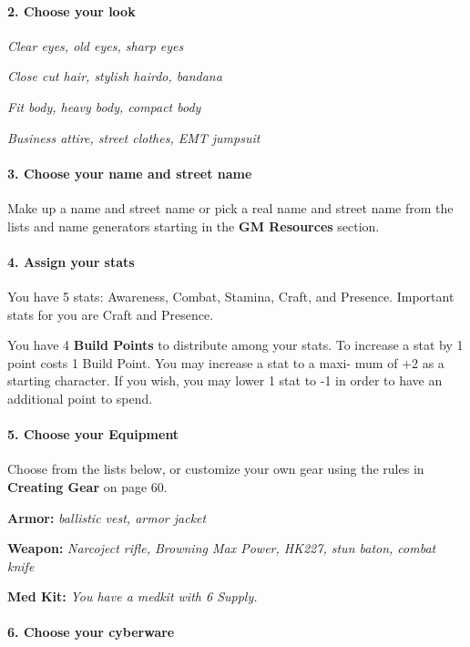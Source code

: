 \begin{multicols}{3}
\paragraph{2.  Choose your look}

\textit{Clear eyes, old eyes, sharp eyes}

\textit{Close cut hair, stylish hairdo, bandana}

\textit{Fit body, heavy body, compact body}

\textit{Business attire, street clothes, EMT jumpsuit}

\paragraph{3.  Choose your name and street name}

Make up a name and street name or pick a real
name and street name from the lists and name
generators starting in the \textbf{GM Resources} section.

\paragraph{4.  Assign your stats}

You have 5 stats: Awareness, Combat, Stamina,
Craft, and Presence. Important stats for you are
Craft and Presence.

You have 4 \textbf{Build Points} to distribute among
your stats. To increase a stat by 1 point costs 1
Build Point. You may increase a stat to a maxi-
mum of +2 as a starting character. If you wish,
you may lower 1 stat to -1 in order to have an
additional point to spend.

\paragraph{5.  Choose your Equipment}

Choose from the lists below, or customize your
own gear using the rules in \textbf{Creating Gear} on
page 60.

\textbf{Armor:} \textit{ballistic vest, armor jacket}

\textbf{Weapon:} \textit{Narcoject rifle, Browning
Max Power, HK227, stun baton, combat knife}

\textbf{Med Kit:} \textit{You have a medkit with 6 Supply.}


\paragraph{6.  Choose your cyberware}


\end{multicols}
